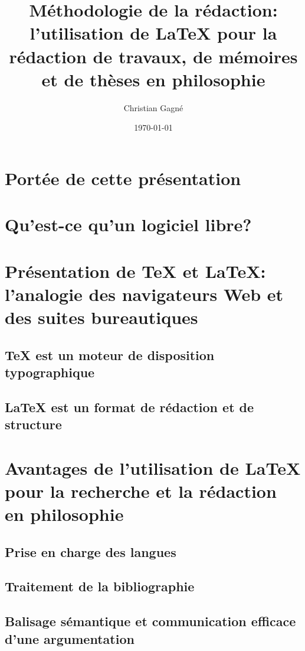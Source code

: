 \documentclass{article}
\title{Méthodologie de la rédaction: l’utilisation de \LaTeX{} pour la rédaction de travaux, de mémoires et de thèses en philosophie}
\author{Christian Gagné}
\date{\today}
\begin{document}
\maketitle

\tableofcontents

\section{Portée de cette présentation}

\section{Qu’est-ce qu’un logiciel libre?}

\section{Présentation de \TeX{} et \LaTeX{}: l’analogie des navigateurs Web et des suites bureautiques}

\subsection{\TeX{} est un moteur de disposition typographique}

\subsection{\LaTeX{} est un format de rédaction et de structure}

\section{Avantages de l’utilisation de \LaTeX{} pour la recherche et la rédaction en philosophie}

\subsection{Prise en charge des langues}

\subsection{Traitement de la bibliographie}

\subsection{Balisage sémantique et communication efficace d’une argumentation}
\end{document}
